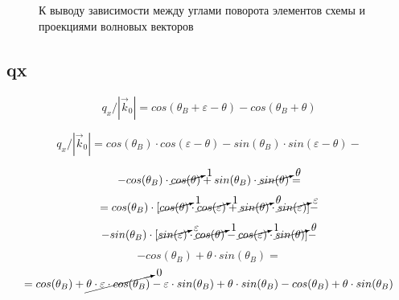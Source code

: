 \newpage
  \begin{center}
  \section{ }%
  \label{sec:_}
  \end{center}
  \begin{figure}[H]
    \centering
    \hfill
    \caption{К выводу зависимости между углами поворота элементов схемы и проекциями волновых векторов}
    \label{ris:}
  \end{figure}




  \subsection*{qx}
  \begin{equation}
\label{eqn: distance}
	 q_x/|\vec{k}_0| = cos(\theta_B + \varepsilon -  \theta) - cos(\theta_B +  \theta)
\end{equation}


$$
	  q_x/|\vec{k}_0| =  cos(\theta_B) \cdot cos(\varepsilon -  \theta) - sin(\theta_B)\cdot sin(\varepsilon -  \theta) -
$$

$$
    - cos(\theta_B)\cdot \cancelto{1}{cos(\theta)} + sin(\theta_B) \cdot \cancelto{\theta}{sin(\theta)} =
$$
$$
	 = cos(\theta_B) \cdot [\cancelto{1}{cos(\theta)} \cdot \cancelto{1}{cos(\varepsilon)} + \cancelto{\theta}{sin(\theta)} \cdot \cancelto{\varepsilon}{sin(\varepsilon)}] -
$$
$$
	 - sin(\theta_B) \cdot [\cancelto{\varepsilon}{sin(\varepsilon)} \cdot
	 \cancelto{1}{cos(\theta)} - \cancelto{1}{cos(\varepsilon)}  \cdot
	 \cancelto{\theta}{sin(\theta)}
	 ]  -
$$
$$
	- cos(\theta_B) +  \theta\cdot sin(\theta_B) =
$$
$$
	= cos(\theta_B) + \cancelto{0}{ \theta \cdot \varepsilon \cdot cos(\theta_B) }
	- \varepsilon \cdot sin(\theta_B) +  \theta\cdot sin(\theta_B) - cos(\theta_B) +  \theta\cdot sin(\theta_B)
$$

